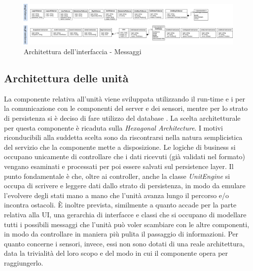 	\begin{landscape}
		\begin{figure}[h!]
			\includegraphics[width=24cm]{img/ui_messaggi.png}
			\caption{Architettura dell'interfaccia - Messaggi}
		\end{figure}
	\end{landscape}

\subsection{Architettura delle unità}
	La componente relativa all'unità viene sviluppata utilizzando il run-time  e i  per la comunicazione con le componenti del server e dei sensori, mentre per lo strato di persistenza si è deciso di fare utilizzo del database .
	La scelta architetturale per questa componente è ricaduta sulla \textit{Hexagonal Architecture}.
	I motivi riconducibili alla suddetta scelta sono da riscontrarsi nella natura semplicistica del servizio che la componente mette a disposizione. Le logiche di business si occupano unicamente di controllare che i dati ricevuti (già validati nel formato) vengano esaminati e processati per poi essere salvati sul persistence layer.
	Il punto fondamentale è che, oltre ai controller, anche la classe \textit{UnitEngine} si occupa di scrivere e leggere dati dallo strato di persistenza, in modo da emulare l'evolvere degli stati mano a mano che l'unità avanza lungo il percorso e/o incontra ostacoli.
	È inoltre prevista, similmente a quanto accade per la parte relativa alla UI, una gerarchia di interfacce e classi che si occupano di modellare tutti i possibili messaggi che l'unità può voler scambiare con le altre componenti, in modo da controllare in maniera più pulita il passaggio di informazioni.
	Per quanto concerne i sensori, invece, essi non sono dotati di una reale architettura, data la trivialità del loro scopo e del modo in cui il componente opera per raggiungerlo.
	
